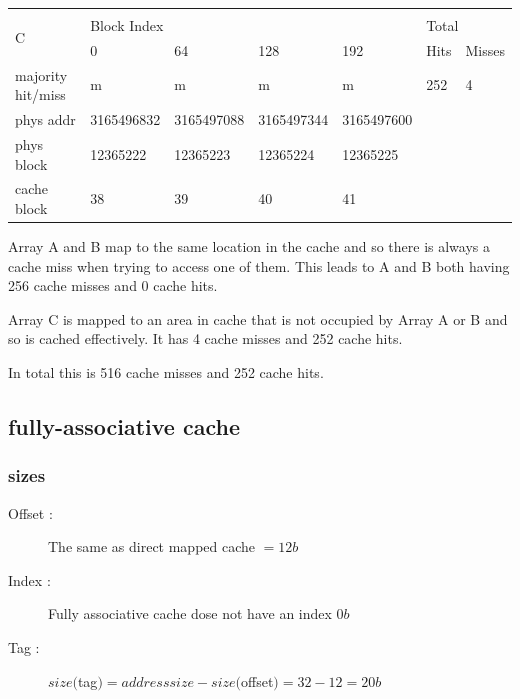 \documentclass[12pt]{article}
\begin{document}
\begin{table}[H]
\begin{tabular}{lllllll}
                                         &            &            &            &                                 &            &              \\
\multicolumn{1}{l|}{\multirow{2}{*}{C}}  & \multicolumn{4}{l|}{Block Index}                                       & \multicolumn{2}{l}{Total} \\
\multicolumn{1}{l|}{}                    & 0          & 64         & 128        & \multicolumn{1}{l|}{192}        & Hits       & Misses       \\ \hline
\multicolumn{1}{l|}{majority hit/miss}   & m          & m          & m          & \multicolumn{1}{l|}{m}          & 252        & 4            \\
\multicolumn{1}{l|}{phys addr}           & 3165496832 & 3165497088 & 3165497344 & \multicolumn{1}{l|}{3165497600} &            &              \\
\multicolumn{1}{l|}{phys block}          & 12365222   & 12365223   & 12365224   & \multicolumn{1}{l|}{12365225}   &            &              \\
\multicolumn{1}{l|}{cache block}         & 38         & 39         & 40         & \multicolumn{1}{l|}{41}         &            &             
\end{tabular}
\end{table}
			
				Array A and B map to the same location in the cache and so there is always a cache miss when trying to access one of them. This leads to A and B both having 256 cache misses and 0 cache hits. 

				Array C is mapped to an area in cache that is not occupied by Array A or B and so is cached effectively. It has 4 cache misses and 252 cache hits.

				In total this is 516 cache misses and 252 cache hits.
		\subsection{fully-associative cache}

			\subsubsection{sizes}
				\begin{description}
					\item[Offset : ] The same as direct mapped cache $ = 12 b$
					\item[Index : ] Fully associative cache dose not have an index $0b$
					\item[Tag : ] $size($tag$) = addresssize- size($offset$) = 32 - 12 = 20b$
				\end{description}
\end{document}
